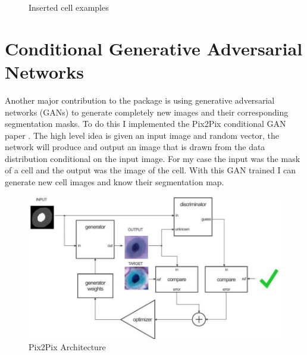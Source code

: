 \documentclass[ms,electronic,oneside,twosidetoc,letterpaper,chaptercenter,parttop]{byumsphd}
\begin{document}
\begin{figure}[H]
   \quad
  \caption{Inserted cell examples}
\end{figure}


\section{Conditional Generative Adversarial Networks}

    Another major contribution to the package is using generative adversarial networks (GANs) to
generate completely new images and their corresponding segmentation masks. To do this I implemented
the Pix2Pix conditional GAN paper \cite{pix2pix}. The high level idea is given an input image and random vector, the network
will produce and output an image that is drawn from the data distribution conditional on the input image. For my 
case the input was the mask of a cell and the output was the image of the cell. With this GAN trained I can
generate new cell images and know their segmentation map.

\begin{figure}[H]
  \centering
  \includegraphics[width=.9\textwidth]{pix2pix}
  \caption{Pix2Pix Architecture \cite{pix2pix-image}}
\end{figure}
\end{document}
